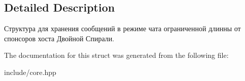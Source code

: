 \subsection{Detailed Description}
Структура для хранения сообщений в режиме чата ограниченной длинны от спонсоров хоста Двойной Спирали. 

The documentation for this struct was generated from the following file\+:\begin{DoxyCompactItemize}
\item 
include/core.\+hpp\end{DoxyCompactItemize}
